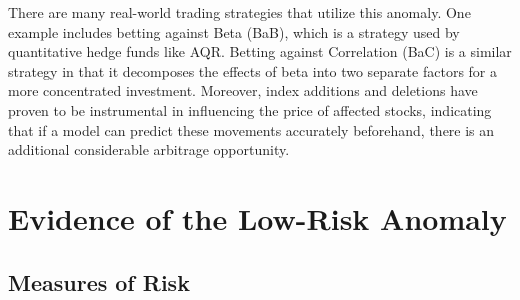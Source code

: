 \documentclass[12pt,twoside]{reedthesis}
\theoremstyle{definition}
\theoremstyle{definition}
\theoremstyle{definition}
\theoremstyle{remark}
\begin{document}
There are many real-world trading strategies that utilize this anomaly.
One example includes betting against Beta (BaB), which is a strategy
used by quantitative hedge funds like AQR. Betting against Correlation
(BaC) is a similar strategy in that it decomposes the effects of beta
into two separate factors for a more concentrated investment. Moreover,
index additions and deletions have proven to be instrumental in
influencing the price of affected stocks, indicating that if a model can
predict these movements accurately beforehand, there is an additional
considerable arbitrage opportunity.

\section{Evidence of the Low-Risk
Anomaly}\label{evidence-of-the-low-risk-anomaly}

\subsection{Measures of Risk}\label{measures-of-risk}
\end{document}
